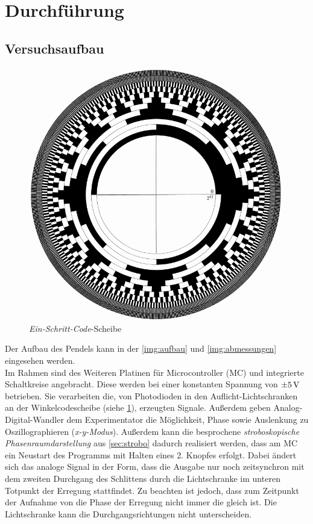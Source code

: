 \documentclass[numbers=noenddot,12pt,a4paper]{scrartcl}
\newcommand{\tilt}[1]{\textit{#1}}
\begin{document}
\section{Durchführung}
\subsection{Versuchsaufbau}
\begin{figure}
\centering
\vspace{-0.5cm}
\includegraphics[scale=0.2]{winkelkot.png}
\caption{\tilt{Ein-Schritt-Code}-Scheibe} \label{img:winkelkot}
\end{figure}
Der Aufbau des Pendels kann in der \ref{img:aufbau} und \ref{img:abmessungen} eingesehen werden.\\
Im Rahmen sind des Weiteren Platinen für Microcontroller (MC) und integrierte Schaltkreise angebracht. Diese werden bei einer konstanten Spannung von $\pm\unit[5]{V}$ betrieben. Sie verarbeiten die, von Photodioden in den Auflicht-Lichtschranken an der Winkelcodescheibe (siehe \ref{img:winkelkot}), erzeugten Signale. Außerdem geben Analog-Digital-Wandler dem Experimentator die Möglichkeit, Phase sowie Auslenkung zu Oszillographieren (\tilt{x-y-Modus}). Außerdem kann die besprochene \tilt{stroboskopische Phasenraumdarstellung} aus \ref{sec:strobo} dadurch realisiert werden, dass am MC ein Neustart des Programms mit Halten eines 2. Knopfes erfolgt. Dabei ändert sich das analoge Signal in der Form, dass die Ausgabe nur noch zeitsynchron mit dem zweiten Durchgang des Schlittens durch die Lichtschranke im unteren Totpunkt der Erregung stattfindet. Zu beachten ist jedoch, dass zum Zeitpunkt der Aufnahme von die Phase der Erregung nicht immer die gleich ist. Die Lichtschranke kann die Durchgangsrichtungen nicht unterscheiden.\\
\end{document}
